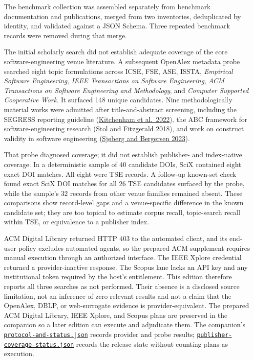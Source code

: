 The benchmark collection was assembled separately from benchmark documentation and publications, merged from two inventories, deduplicated by identity, and validated against a JSON Schema. Three repeated benchmark records were removed during that merge.

The initial scholarly search did not establish adequate coverage of the core software-engineering venue literature. A subsequent OpenAlex metadata probe searched eight topic formulations across ICSE, FSE, ASE, ISSTA, \emph{Empirical Software Engineering}, \emph{IEEE Transactions on Software Engineering}, \emph{ACM Transactions on Software Engineering and Methodology}, and \emph{Computer Supported Cooperative Work}. It surfaced 148 unique candidates. Nine methodologically material works were admitted after title-and-abstract screening, including the SEGRESS reporting guideline (\href{https://doi.org/10.1109/TSE.2022.3174092}{Kitchenham et al.~2022}), the ABC framework for software-engineering research (\href{https://doi.org/10.1145/3241743}{Stol and Fitzgerald 2018}), and work on construct validity in software engineering (\href{https://doi.org/10.1109/TSE.2022.3176725}{Sjøberg and Bergersen 2023}).

That probe diagnosed coverage; it did not establish publisher- and index-native coverage. In a deterministic sample of 40 candidate DOIs, SciX contained eight exact DOI matches. All eight were TSE records. A follow-up known-set check found exact SciX DOI matches for all 26 TSE candidates surfaced by the probe, while the sample's 32 records from other venue families remained absent. These comparisons show record-level gaps and a venue-specific difference in the known candidate set; they are too topical to estimate corpus recall, topic-search recall within TSE, or equivalence to a publisher index.

ACM Digital Library returned HTTP 403 to the automated client, and its end-user policy excludes automated agents, so the prepared ACM supplement requires manual execution through an authorized interface. The IEEE Xplore credential returned a provider-inactive response. The Scopus lane lacks an API key and any institutional token required by the host's entitlement. This edition therefore reports all three searches as not performed. Their absence is a disclosed source limitation, not an inference of zero relevant results and not a claim that the OpenAlex, DBLP, or web-surrogate evidence is provider-equivalent. The prepared ACM Digital Library, IEEE Xplore, and Scopus plans are preserved in the companion so a later edition can execute and adjudicate them. The companion's \href{https://github.com/sjarmak/engineering-reliable-coding-agents/blob/main/companion/methodology/software-engineering-coverage/protocol-and-status.json}{\texttt{protocol-and-status.json}} records provider and probe results; \href{https://github.com/sjarmak/engineering-reliable-coding-agents/blob/main/companion/methodology/software-engineering-coverage/publisher-coverage-status.json}{\texttt{publisher-coverage-status.json}} records the release state without counting plans as execution.

